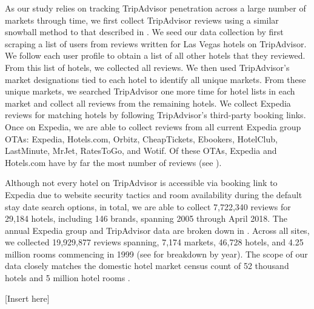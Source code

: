\documentclass[mksc,blindrev]{informs3} %
\begin{document}

As our study relies on tracking TripAdvisor penetration across a large number of markets through time, we first collect TripAdvisor reviews using a similar snowball method to that described in \citet{wang2018and}. We seed our data collection by first scraping a list of users from reviews written for Las Vegas hotels on TripAdvisor. We follow each user profile to obtain a list of all other hotels that they reviewed. From this list of hotels, we collected all reviews. We then used TripAdvisor's market designations tied to each hotel to identify all unique markets. From these unique markets, we searched TripAdvisor one more time for hotel lists in each market and collect all reviews from the remaining hotels. We collect Expedia reviews for matching hotels by following TripAdvisor's third-party booking links. Once on Expedia, we are able to collect reviews from all current Expedia group OTAs: Expedia, Hotels.com, Orbitz, CheapTickets, Ebookers, HotelClub, LastMinute, MrJet, RatesToGo, and Wotif. Of these OTAs, Expedia and Hotels.com have by far the most number of reviews (see ).

Although not every hotel on TripAdvisor is accessible via booking link to Expedia due to website security tactics and room availability during the default stay date search options, in total, we are able to collect 7,722,340 reviews for 29,184 hotels, including 146 brands, spanning 2005 through April 2018. The annual Expedia group and TripAdvisor data are broken down in . Across all sites, we collected 19,929,877 reviews spanning, 7,174 markets, 46,728 hotels, and 4.25 million rooms commencing in 1999 (see  for breakdown by year). The scope of our data closely matches the domestic hotel market census count of 52 thousand hotels and 5 million hotel rooms \citep{hotelnews2015}. 


[Insert  here]
\end{document}
